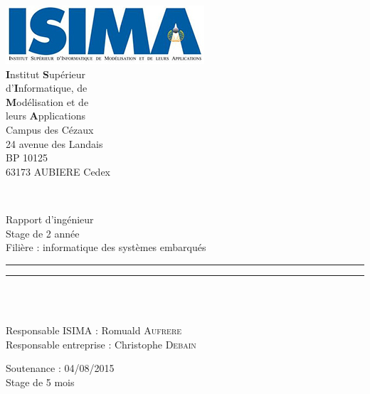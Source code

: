 
\begin{titlepage}
   \noindent
   \begin{minipage}{.45\textwidth}
      \includegraphics[width=.8\textwidth]{img/logo_isima.png}
      \\[.5cm]
      \textbf{I}nstitut \textbf{S}upérieur \\
      d'\textbf{I}nformatique, de \\
      \textbf{M}odélisation et de \\
      leurs \textbf{A}pplications
      \\[.5cm]
      \footnotesize
      Campus des Cézaux \\
      24 avenue des Landais \\
      BP 10125 \\
      63173 AUBIERE Cedex
   \end{minipage}
   \hspace{.03\textwidth}
   \\[.5cm]
   \begin{center}
      Rapport d'ingénieur \\
      Stage de 2\ieme{} année \\
      Filière : informatique des systèmes embarqués
      \rule{\textwidth}{.3pt}
      \LARGE \textbf{\textsc{\@title}}
      \rule{\textwidth}{.3pt}
      \hbox{\vspace{3cm}} \\
   \end{center}
   {\large \textbf{\@author}}
   \\[.5cm]
   Responsable ISIMA : Romuald \textsc{Aufrere} \\
   Responsable entreprise : Christophe \textsc{Debain} \\
   \begin{flushright}
      \footnotesize
      Soutenance : 04/08/2015 \\
      Stage de 5 mois
   \end{flushright}
\end{titlepage}
